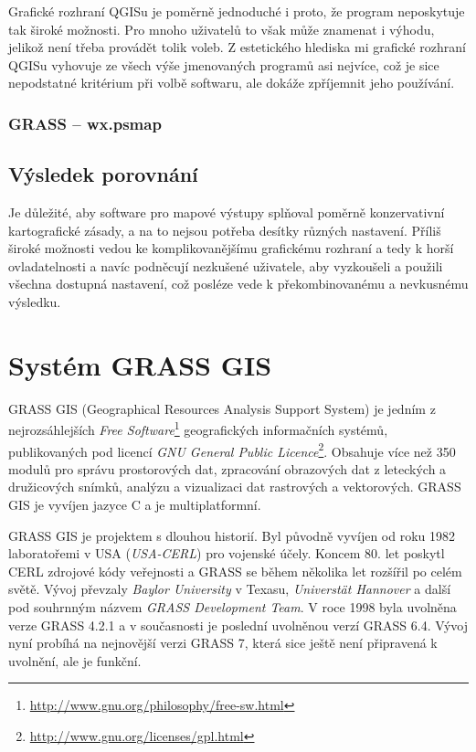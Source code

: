\documentclass[a4paper,12pt,draft]{article}
\begin{document}
Grafické rozhraní QGISu je poměrně jednoduché i proto, že program
neposkytuje tak široké možnosti. Pro mnoho uživatelů to však
může znamenat i výhodu, jelikož není třeba provádět tolik voleb.
Z estetického hlediska mi grafické rozhraní QGISu vyhovuje ze všech výše
jmenovaných programů asi nejvíce, což je sice nepodstatné kritérium
při volbě softwaru, ale dokáže zpříjemnit jeho používání.
\subsubsection{GRASS -- wx.psmap}

\subsection{Výsledek porovnání}
Je důležité, aby software pro mapové výstupy splňoval poměrně
konzervativní kartografické zásady, a na to nejsou potřeba
desítky různých nastavení. Příliš široké možnosti vedou ke
komplikovanějšímu grafickému rozhraní a tedy k horší ovladatelnosti
a navíc podněcují nezkušené uživatele, aby vyzkoušeli a použili
všechna dostupná nastavení, což posléze vede k překombinovanému a
nevkusnému výsledku.


\section{Systém GRASS GIS}
\label{sec:grass}
GRASS GIS (Geographical Resources Analysis Support
System) je jedním z nejrozsáhlejších \emph{Free
Software}\footnote{\url{http://www.gnu.org/philosophy/free-sw.html}}
geografických informačních systémů,
publikovaných pod licencí \emph{GNU General Public
Licence}\footnote{\url{http://www.gnu.org/licenses/gpl.html}}. Obsahuje více
než 350 modulů pro správu prostorových dat, zpracování obrazových dat
z leteckých a družicových snímků, analýzu a vizualizaci dat rastrových
a vektorových. GRASS GIS je vyvíjen jazyce C a je multiplatformní.

GRASS GIS je projektem s dlouhou historií. Byl původně vyvíjen od roku
1982 laboratořemi v USA (\emph{USA-CERL}) pro vojenské účely. Koncem
80. let poskytl CERL zdrojové kódy veřejnosti a GRASS se během několika
let rozšířil po celém světě. Vývoj převzaly \emph{Baylor University}
v Texasu, \emph{Universtät Hannover} a další pod souhrnným názvem
\emph{GRASS Development Team}. V roce 1998 byla uvolněna verze GRASS
4.2.1 a v současnosti je poslední uvolněnou verzí GRASS 6.4. Vývoj
nyní probíhá na nejnovější verzi GRASS 7, která sice ještě není
připravená k uvolnění, ale je funkční.
\end{document}
